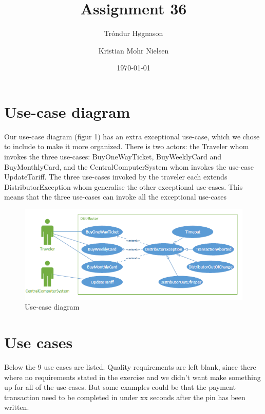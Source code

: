 \documentclass[pdftex,12pt,a4paper]{article}
\begin{document}
\title{Assignment 36}
\author{Tróndur Høgnason \and  Kristian Mohr Nielsen}
\date{\today}
\maketitle
\pagebreak

\section{Use-case diagram}
Our use-case diagram (figur 1) has an extra exceptional use-case, which we chose to include to make it more organized. There is two actors: the Traveler whom invokes the three use-cases: BuyOneWayTicket, BuyWeeklyCard and BuyMonthlyCard, and the CentralComputerSystem whom invokes the use-case UpdateTariff. The three use-cases invoked by the traveler each extends DistributorException whom generalise the other exceptional use-cases. This means that the three use-cases can invoke all the exceptional use-cases
\begin{figure}[h]
\centering
\includegraphics[scale = 0.9]{usecase.png}
\caption{Use-case diagram}
\end{figure}
\pagebreak

\section{Use cases}
Below the 9 use cases are listed. Quality requirements are left blank, since there where no requirements stated in the exercise and we didn't want make something up for all of the use-cases. But some examples could be that the payment transaction need to be completed in under xx seconds after the pin has been written. 


\pagebreak

\pagebreak

\pagebreak

\pagebreak

\pagebreak

\pagebreak

\pagebreak

\pagebreak

\pagebreak
\end{document}
